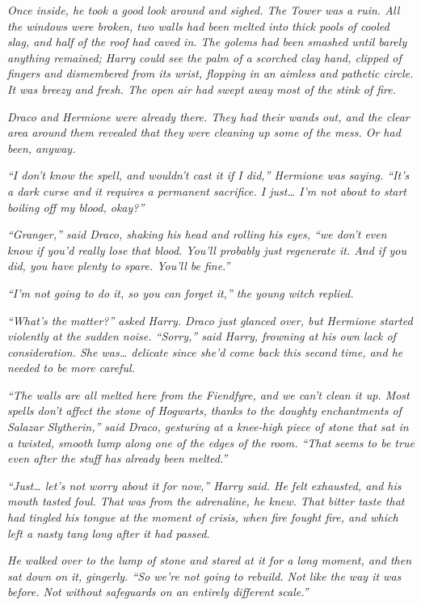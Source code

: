 \emph{Once inside, he took a good look around and sighed. The Tower was
a ruin. All the windows were broken, two walls had been melted into
thick pools of cooled slag, and half of the roof had caved in. The
golems had been smashed until barely anything remained; Harry could see
the palm of a scorched clay hand, clipped of fingers and dismembered
from its wrist, flopping in an aimless and pathetic circle.} \emph{It
was breezy and fresh. The open air had swept away most of the stink of
fire.}

\emph{Draco and Hermione were already there. They had their wands out,
and the clear area around them revealed that they were cleaning up some
of the mess. Or had been, anyway.}

\emph{``I don't know the spell, and wouldn't cast it if I did,''
Hermione was saying. ``It's a dark curse and it requires a permanent
sacrifice. I just\ldots{} I'm not about to start boiling off my blood,
okay?''}

\emph{``Granger,'' said Draco, shaking his head and rolling his eyes,
``we don't even know if you'd really lose that blood. You'll probably
just regenerate it. And if you did, you have plenty to spare. You'll be
fine.''}

\emph{``I'm not going to do it, so you can forget it,'' the young witch
replied.}

\emph{``What's the matter?'' asked Harry. Draco just glanced over, but
Hermione started violently at the sudden noise. ``Sorry,'' said Harry,
frowning at his own lack of consideration. She was\ldots{} delicate
since she'd come back this second time, and he needed to be more
careful.}

\emph{``The walls are all melted here from the Fiendfyre, and we can't
clean it up. Most spells don't affect the stone of Hogwarts, thanks to
the doughty enchantments of Salazar Slytherin,'' said Draco, gesturing
at a knee-high piece of stone that sat in a twisted, smooth lump along
one of the edges of the room. ``That seems to be true even after the
stuff has already been melted.''}

\emph{``Just\ldots{} let's not worry about it for now,'' Harry said. He
felt exhausted, and his mouth tasted foul. That was from the adrenaline,
he knew. That bitter taste that had tingled his tongue at the moment of
crisis, when fire fought fire, and which left a nasty tang long after it
had passed.}

\emph{He walked over to the lump of stone and stared at it for a long
moment, and then sat down on it, gingerly. ``So we're not going to
rebuild. Not like the way it was before. Not without safeguards on an
entirely different scale.''}

